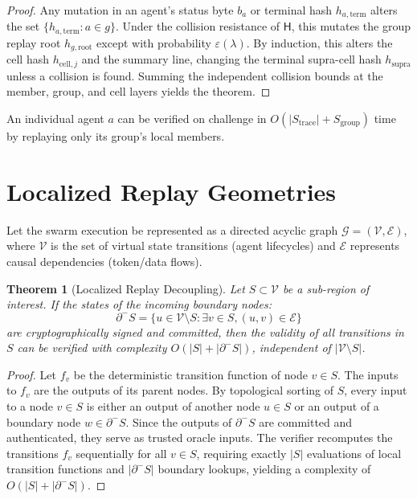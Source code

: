 \documentclass[11pt,oneside]{book}
\theoremstyle{definition}
\theoremstyle{plain}
\newtheorem{theorem}{Theorem}[chapter]
\theoremstyle{remark}
\newcommand{\chainH}{\mathsf{H}}               %
\newcommand{\abyte}[1]{{b_{#1}}}                 %
\begin{document}
\begin{proof}
Any mutation in an agent's status byte $\abyte{a}$ or terminal hash $h_{a,\mathrm{term}}$ alters the set $\{h_{a,\mathrm{term}} : a \in g\}$. %
Under the collision resistance of $\chainH$, this mutates the group replay root $h_{g,\mathrm{root}}$ except with probability $\varepsilon(\lambda)$. %
By induction, this alters the cell hash $h_{\mathrm{cell}, j}$ and the summary line, changing the terminal supra-cell hash $h_{\mathrm{supra}}$ unless a collision is found. %
Summing the independent collision bounds at the member, group, and cell layers yields the theorem. %
\end{proof}

An individual agent $a$ can be verified on challenge in $O(|S_{\mathrm{trace}}| + S_{\mathrm{group}})$ time by replaying only its group's local members. %

\section{Localized Replay Geometries}
Let the swarm execution be represented as a directed acyclic graph $\mathcal{G} = (\mathcal{V}, \mathcal{E})$, where $\mathcal{V}$ is the set of virtual state transitions (agent lifecycles) and $\mathcal{E}$ represents causal dependencies (token/data flows). %

\begin{theorem}[Localized Replay Decoupling]\label{thm:local_decoupling}
Let $S \subset \mathcal{V}$ be a sub-region of interest. %
If the states of the incoming boundary nodes:
\[
\partial^{-} S = \{ u \in \mathcal{V} \setminus S : \exists v \in S, (u, v) \in \mathcal{E} \}
\]
are cryptographically signed and committed, then the validity of all transitions in $S$ can be verified with complexity $O(|S| + |\partial^{-} S|)$, independent of $|\mathcal{V} \setminus S|$. %
\end{theorem}

\begin{proof}
Let $f_v$ be the deterministic transition function of node $v \in S$. %
The inputs to $f_v$ are the outputs of its parent nodes. %
By topological sorting of $S$, every input to a node $v \in S$ is either an output of another node $u \in S$ or an output of a boundary node $w \in \partial^{-} S$. %
Since the outputs of $\partial^{-} S$ are committed and authenticated, they serve as trusted oracle inputs. %
The verifier recomputes the transitions $f_v$ sequentially for all $v \in S$, requiring exactly $|S|$ evaluations of local transition functions and $|\partial^{-} S|$ boundary lookups, yielding a complexity of $O(|S| + |\partial^{-} S|)$. %
\end{proof}
\end{document}
